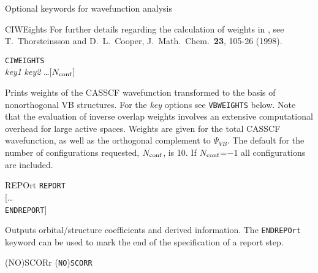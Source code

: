 Optional keywords for wavefunction analysis
\begin{keywordlist}
\item[CIWEights]
For further details regarding the calculation of weights in , see
T.~Thorsteinsson and D.~L.~Cooper, J.\ Math.\ Chem.\ {\bf 23}, 105-26 (1998).

{\tt CIWEIGHTS}\\
{\em key1} {\em key2} \ldots [$N_{\rm conf}$]

Prints weights of the CASSCF wavefunction transformed
to the basis of nonorthogonal VB structures. For the {\em key\/} options
see {\tt VBWEIGHTS} below. Note that the evaluation of inverse overlap
weights involves an extensive computational overhead for large active
spaces. Weights are given for the
total CASSCF wavefunction, as well as the orthogonal complement to
$\Psi_{VB}$. The default for the number of configurations requested,
$N_{\rm conf}$, is 10. If $N_{\rm conf}$=$-1$ all configurations are
included.
\item[REPOrt]
{\tt REPORT}\\
{[}\ldots \\
{\tt ENDREPORT}{]}

Outputs orbital/structure coefficients and derived information.
The {\tt ENDREPOrt} keyword can be used to mark the end of the specification
of a report step.
\item[(NO)SCORr]
%
({\tt NO}){\tt SCORR}


\end{keywordlist}
